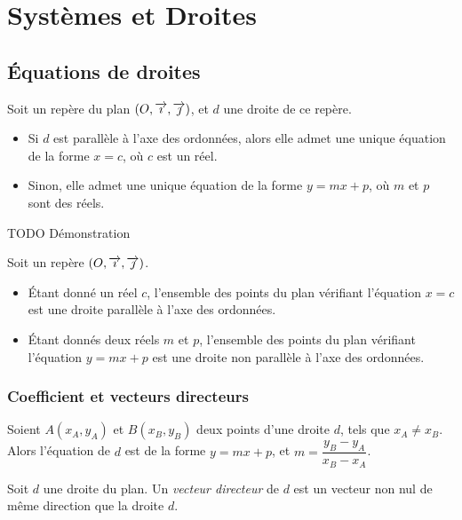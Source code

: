 \chapter{Systèmes et Droites}
\section{Équations de droites}

\begin{propriete}
  Soit un repère du plan $(O, \overrightarrow{\imath}, \overrightarrow{\jmath})$, et $d$
  une droite de ce repère.

  \begin{itemize}
    \item Si $d$ est parallèle à l'axe des ordonnées, alors elle admet une
      unique équation de la forme $x=c$, où $c$ est un réel.
    \item Sinon, elle admet une unique équation de la forme $y=mx+p$, où $m$ et
      $p$ sont des réels.
  \end{itemize}
\end{propriete}
TODO Démonstration

\begin{propriete}[Réciproque]
  Soit un repère $(O, \overrightarrow{\imath}, \overrightarrow{\jmath})$.
  \begin{itemize}
    \item Étant donné un réel $c$, l'ensemble des points du plan
      vérifiant l'équation $x=c$ est une droite parallèle à l'axe des
      ordonnées.
    \item Étant donnés deux réels $m$ et $p$, l'ensemble des points du plan
      vérifiant l'équation $y=mx+p$ est une droite non parallèle à l'axe des
      ordonnées.
  \end{itemize}
\end{propriete}

\subsection*{Coefficient et vecteurs directeurs}

\begin{propriete}
  Soient $A(x_A, y_A)$ et $B(x_B, y_B)$ deux points d'une droite $d$, tels que
  $x_A\neq x_B$. Alors l'équation de $d$ est de la forme $y=mx+p$, et
  $m=\dfrac{y_B-y_A}{x_B-x_A}$.
\end{propriete}

\begin{definition}
  Soit $d$ une droite du plan. Un \emph{vecteur directeur} de $d$ est un
  vecteur non nul de même direction que la droite $d$.
\end{definition}


